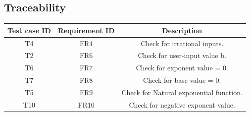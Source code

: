 \documentclass[a4paper,12pt]{report}
\begin{document}
\subsection{Traceability}
\begin{center}
    \begin{tabular}{|c|c|c|}
         \hline
         Test case ID & Requirement ID & Description \\
         \hline\hline
         T4 & FR4 & Check for irrational inputs.\\
         \hline
         T2 & FR6 & Check for user-input value b. \\
         \hline
         T6 & FR7 & Check for exponent value = 0.\\
         \hline
         T7 & FR8 & Check for base value = 0.\\
         \hline
         T5 & FR9 & Check for Natural exponential function.\\
         \hline
         T10 & FR10 & Check for negative exponent value.\\
        \end{tabular}
        \label{tab:xyz}
\end{center}
\end{document}
